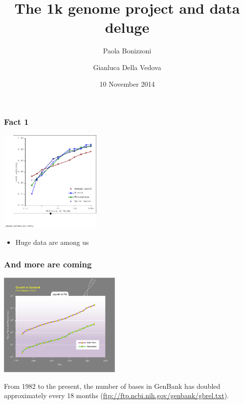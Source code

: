 \usepackage[italian]{babel}
\usepackage[utf8]{inputenc}
\usepackage{pgf}
\usepackage{verbatim}
\usepackage[ruled,vlined,linesnumbered]{algorithm2e}
\usepackage{amsfonts,eucal}



\author{Paola Bonizzoni \and Gianluca Della Vedova}
\title{The 1k genome project and data deluge}
\date{10 November 2014}

\DeclareMathOperator{\poly}{\text{poly}}
\DeclareMathOperator{\polylog}{\text{polylog}}


\beamerdefaultoverlayspecification{<+->}




\begin{frame}
  \titlepage
\end{frame}

\begin{frame}\frametitle{Fact 1}
  \includegraphics[width=5cm]{growing-data-1.png}
  \begin{itemize}
  \item
    Huge data are among us
  \end{itemize}
\end{frame}


\begin{frame}\frametitle{And more are coming}
  \includegraphics[width=6cm]{Kurzweil_DNA_Sequence_data_growth,_base_pairs_and_sequences_per_year.png}

  \small
  From 1982 to the present, the number of bases in GenBank has doubled
approximately every 18 months (\url{ftp://ftp.ncbi.nih.gov/genbank/gbrel.txt}).
\end{frame}

